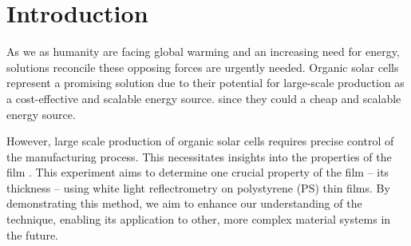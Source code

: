 

\chapter{Introduction}
\label{chap:einleitung}

As we as humanity are facing global warming and an increasing need for energy, solutions reconcile these opposing forces are urgently needed. Organic solar cells represent a promising solution due to their potential for large-scale production as a cost-effective and scalable energy source.
since they could a cheap and scalable energy source.

However, large scale production of organic solar cells requires precise control of the manufacturing process. This necessitates insights into the properties of the film . This experiment aims to determine one crucial property of the film -- its thickness -- using white light reflectrometry on polystyrene (PS) thin films.  By demonstrating this method, we aim to enhance our understanding of the technique, enabling its application to other, more complex material systems in the future.


